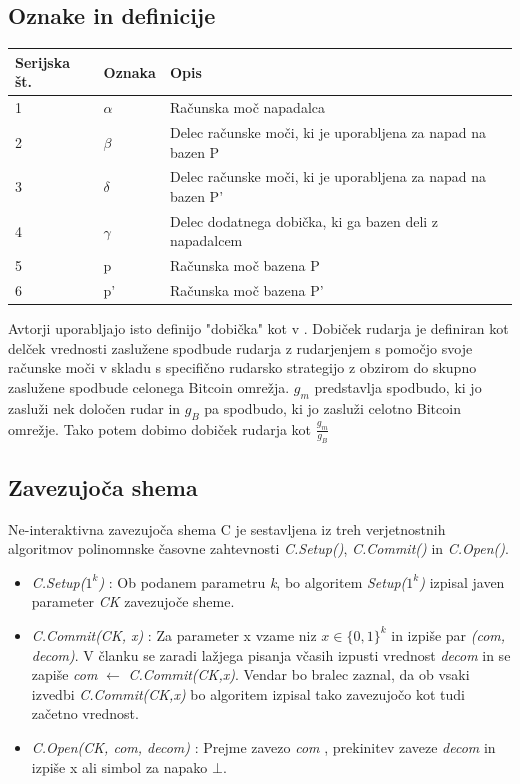 \documentclass{acm_proc_article-sp}
\begin{document}
\subsection{Oznake in definicije}\label{sekcija2a}
\begin{center}
	
	\begin{tabular} {| p{1cm} | p{1cm} | p{4cm}|}
		\hline
		Serijska št. & Oznaka  & Opis \\ \hline
		1 & $\alpha$ & Računska moč napadalca \\  \hline
		2 & $\beta$ & Delec računske moči, ki je uporabljena za napad na bazen  P \\  \hline
		3 & $\delta$ & Delec  računske moči, ki je uporabljena za napad na bazen P' \\  \hline
		4 & $\gamma$ & Delec dodatnega dobička, ki ga bazen deli z napadalcem \\  \hline
		5 & p & Računska moč bazena P  \\ \hline
		6 & p' & Računska moč bazena P'  \\ \hline
	\end{tabular}
\end{center}

\begin{definicija}
	 Avtorji \cite{originalarticle} uporabljajo isto definijo "dobička" kot v \cite{powersplitting}. Dobiček rudarja je definiran kot delček vrednosti zaslužene spodbude rudarja z rudarjenjem s pomočjo svoje računske moči v skladu s specifično rudarsko strategijo z obzirom do skupno zaslužene spodbude celonega Bitcoin omrežja. $g_m$ predstavlja spodbudo, ki jo zasluži nek določen rudar in $g_B$ pa spodbudo, ki jo zasluži celotno Bitcoin omrežje. Tako potem dobimo dobiček rudarja kot $\frac{g_m}{g_B}$
\end{definicija} 

\subsection{Zavezujoča shema}\label{sekcija2b}
Ne-interaktivna zavezujoča shema \cite{datamininglectures} C je sestavljena iz treh verjetnostnih algoritmov polinomnske časovne zahtevnosti \textit{C.Setup()}, \textit{C.Commit()} in \textit{C.Open()}.
\begin{itemize}
	\item \textit{C.Setup($1^k$)} : Ob podanem parametru \textit{k}, bo algoritem \textit{Setup($1^k$)} izpisal javen parameter \textit{CK} zavezujoče sheme.
	\item \textit{C.Commit(CK, x)} : Za parameter x vzame niz $x \in \{0,1\}^k$ in izpiše par  \textit{(com, decom)}. V članku \cite{originalarticle} se zaradi lažjega pisanja včasih izpusti vrednost \textit{decom} in se zapiše  \textit{com} $\leftarrow$ \textit{C.Commit(CK,x)}. Vendar bo bralec zaznal, da ob vsaki izvedbi \textit{C.Commit(CK,x)} bo algoritem izpisal tako zavezujočo kot tudi začetno vrednost.
	\item \textit{C.Open(CK, com, decom)} : Prejme zavezo \textit{com} , prekinitev zaveze \textit{decom} in izpiše x ali simbol za napako $\bot$.
\end{itemize}
\end{document}
